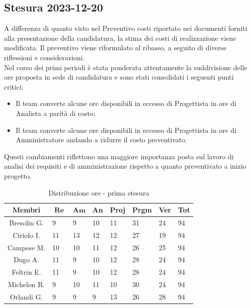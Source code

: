 \documentclass[10pt, a4paper]{article}
\begin{document}
{{{{{{\subsection{Stesura 2023-12-20}
A differenza di quanto visto nel Preventivo costi riportato nei documenti forniti alla presentazione della candidatura, la stima dei costi di realizzazione viene modificata. Il preventivo viene riformulato al ribasso, a seguito di diverse riflessioni e considerazioni. \\ Nel corso dei primi periodi è stata ponderata attentamente la suddivisione delle ore proposta in sede di candidatura e sono stati consolidati i seguenti punti critici:
\begin{itemize}
    \item Il team converte alcune ore disponibili in eccesso di Progettista in ore di Analista a parità di costo;
    \item Il team converte alcune ore disponibili in eccesso di Progettista in ore di Amministratore andando a ridurre il costo preventivato.
\end{itemize}
Questi cambiamenti riflettono una maggiore importanza posta sul lavoro di analisi dei requisiti e di amministrazione rispetto a quanto preventivato a inizio progetto.\\


{\renewcommand{\arraystretch}{1.2}
\begin{table}[H]
\begin{tabularx}{\textwidth}{c|X|X|X|X|X|X|X}
        \textbf{Membri} & $\operatorname{\textbf{Re}}$ & $\mathrm{\textbf{Am}}$ & \textbf{An} & \textbf{Proj} & \textbf{Prgm} & \textbf{Ver} & \textbf{Tot} \\
        \hline Bresolin G. & 9 & 9 & 10 & 11 & 31 & 24 & 94 \\
        \hline Ciriolo I. & 11 & 13 & 12 & 12 & 27 & 19 & 94 \\
        \hline Campese M. & 10 & 10 & 11 & 12 & 26 & 25 & 94 \\
        \hline Dugo A.   & 11 & 9 & 10 & 12 & 28 & 24 & 94 \\
        \hline Feltrin E. & 11 & 9 & 10 & 12 & 28 & 24 & 94 \\
        \hline Michelon R. & 9 & 10 & 11 & 10 & 30 & 24 & 94 \\
        \hline Orlandi G. & 9 & 9 & 9 & 13 & 26 & 28 & 94 
    \end{tabularx}
    \caption{Distribuzione ore - prima stesura}
    \end{table}

}}}}}}}
\end{document}
